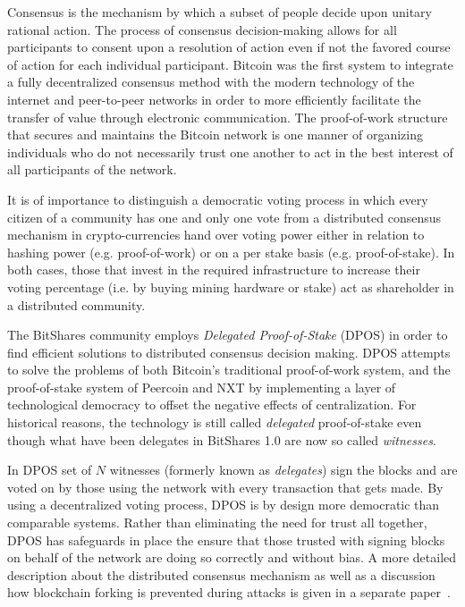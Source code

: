 \label{sec:consensus}

Consensus is the mechanism by which a subset of people decide upon unitary
rational action. The process of consensus decision-making allows for all
participants to consent upon a resolution of action even if not the favored
course of action for each individual participant. Bitcoin was the first system
to integrate a fully decentralized consensus method with the modern technology
of the internet and peer-to-peer networks in order to more efficiently
facilitate the transfer of value through electronic communication. The
proof-of-work structure that secures and maintains the Bitcoin network is one
manner of organizing individuals who do not necessarily trust one another to
act in the best interest of all participants of the network.

It is of importance to distinguish a democratic voting process in which every
citizen of a community has one and only one vote from a distributed consensus
mechanism in crypto-currencies hand over voting power either in relation to
hashing power (e.g. proof-of-work) or on a per stake basis (e.g.
proof-of-stake). In both cases, those that invest in the required
infrastructure to increase their voting percentage (i.e. by buying mining
hardware or stake) act as shareholder in a distributed community.

The BitShares community employs \emph{Delegated Proof-of-Stake} (DPOS) in order
to find efficient solutions to distributed consensus decision making.  DPOS
attempts to solve the problems of both Bitcoin's traditional proof-of-work
system, and the proof-of-stake system of Peercoin and NXT by implementing a
layer of technological democracy to offset the negative effects of
centralization. For historical reasons, the technology is still called
\emph{delegated} proof-of-stake even though what have been delegates in
BitShares 1.0 are now so called \emph{witnesses}.

In DPOS set of $N$ witnesses (formerly known as \emph{delegates}) sign the
blocks and are voted on by those using the network with every transaction that
gets made. By using a decentralized voting process, DPOS is by design more
democratic than comparable systems. Rather than eliminating the need for trust
all together, DPOS has safeguards in place the ensure that those trusted with
signing blocks on behalf of the network are doing so correctly and without
bias. A more detailed description about the distributed consensus mechanism as
well as a discussion how blockchain forking is prevented during attacks is
given in a separate paper~\cite{bts:consensus}.

